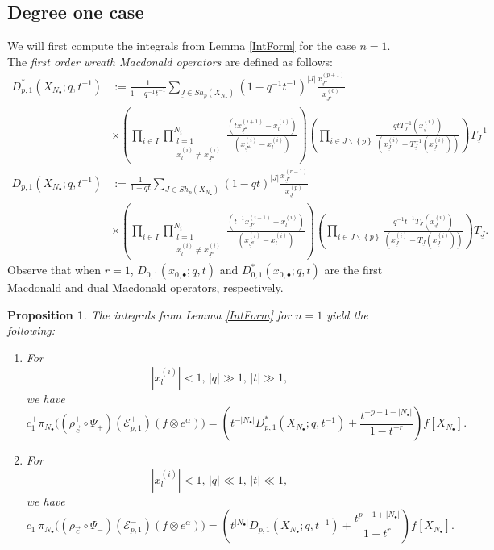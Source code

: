 \documentclass{amsart}
\renewcommand{\triangle}{\vartriangle}
\newcommand{\Ju}{{\underline{J}}}
\newtheorem{prop}[thm]{Proposition}
\theoremstyle{remark}
\numberwithin{thm}{section}
\numberwithin{equation}{section}
\begin{document}
\subsection{Degree one case}\label{Deg1}
We will first compute the integrals from Lemma \ref{IntForm} for the case $n=1$.
The \textit{first order wreath Macdonald operators} are defined as follows:
\begin{align*}
D_{p,1}^*(X_{N_\bullet};q,t^{-1})
&:=
\frac{1}{1-q^{-1}t^{-1}}
\sum_{\Ju\in Sh_p(X_{N_\bullet})}
\left( 1-q^{-1}t^{-1} \right)^{|J|}
\frac{x^{(p+1)}_{\Ju^\triangle}}{x_{\Ju^\triangle}^{(0)}}\\
&\times
\left(\prod_{i\in I}
\prod_{\substack{l=1\\x_{l}^{(i)}\not= x^{(i)}_{\Ju^\triangle}}}^{N_i}
\frac{\left(t x^{(i+1)}_{\Ju^\triangle}-x^{(i)}_{l} \right)}
{\left( x^{(i)}_{\Ju^\triangle}-x^{(i)}_{l} \right)}\right)
\left(\prod_{i\in J\backslash\left\{ p \right\}}
\frac{qtT_\Ju^{-1}(x^{(i)}_{\Ju})}{\left( x^{(i)}_{\Ju}-T_\Ju^{-1}(x^{(i)}_{\Ju}) \right)}\right)
T_\Ju^{-1}\\
D_{p,1}(X_{N_\bullet}; q, t^{-1})
&:=
\frac{1}{1-qt}
\sum_{\Ju\in Sh_{p}(X_{N_\bullet})}\left( 1-qt \right)^{|J|}
\frac{x^{(r-1)}_{\Ju^\triangledown}}{x^{(p)}_{\Ju}}\\
&\times
\left(\prod_{i\in I}
\prod_{\substack{l=1\\x^{(i)}_{l}\not= x^{(i)}_{\Ju^\triangledown}}}^{N_i}
\frac{\left( t^{-1}x^{(i-1)}_{\Ju^\triangledown}-x^{(i)}_{l} \right)}
{\left( x^{(i)}_{\Ju^\triangledown}-x^{(i)}_{l} \right)}\right)
\left(\prod_{i\in J\backslash\left\{ p \right\}}
\frac{q^{-1}t^{-1}T_\Ju(x^{(i)}_{\Ju})}{\left( x^{(i)}_{\Ju}-T_\Ju (x^{(i)}_{\Ju}) \right)}\right)
T_\Ju.
\end{align*}
Observe that when $r=1$, $D_{0,1}(x_{0,\bullet};q,t)$ and $D_{0,1}^*(x_{0,\bullet};q,t)$ are the first Macdonald and dual Macdonald operators, respectively.
\begin{prop}\label{Deg1Int}
The integrals from Lemma \ref{IntForm} for $n=1$ yield the following:
\begin{enumerate}
\item[$(+)$]
For
\[
|x_{l}^{(i)}|<1,\, |q|\gg1,\, |t|\gg1,
\]
we have
\begin{equation*}
c_1^+
\pi_{N_\bullet}\biggl( (\rho_{\vec{c}}^+\circ\Psi_+)(\mathcal{E}_{p,1}^+)(f\otimes e^\alpha)\biggr)
=
\left(t^{-|N_\bullet|}D_{p,1}^*(X_{N_{\bullet}};q,t^{-1})+\frac{t^{-p-1-|N_\bullet|}}{1-t^{-r}}\right)f\left[ X_{N_\bullet} \right].
\end{equation*}
\item[$(-)$]
For 
\[
|x_{l}^{(i)}|<1,\, |q|\ll 1,\, |t|\ll 1,
\]
we have
\begin{equation*}
c_1^-
\pi_{N_\bullet}\biggl( (\rho_{\vec{c}}^-\circ\Psi_-)(\mathcal{E}_{p,1}^-)(f\otimes e^\alpha)\biggr)
=
\left(t^{|N_\bullet|}D_{p,1}(X_{N_{\bullet}};q,t^{-1})+\frac{t^{p+1+|N_\bullet|}}{1-t^{r}}\right)f\left[ X_{N_\bullet} \right].
\end{equation*}
\end{enumerate}
\end{prop}
\end{document}
